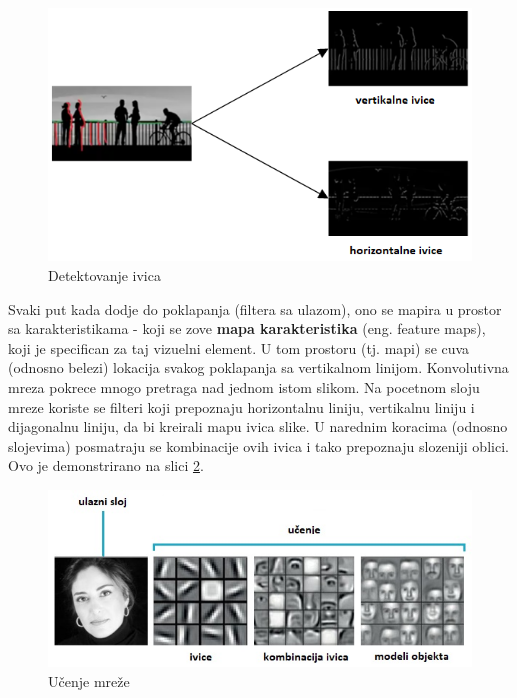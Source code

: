 \documentclass[a4paper]{article}
\begin{document}
\begin{figure}[h!]
\begin{center}
\includegraphics[scale=1]{edges.png}
\end{center}
\caption{Detektovanje ivica}
\label{fig:edges}
\end{figure}

Svaki put kada dodje do poklapanja (filtera sa ulazom), ono se mapira u prostor sa karakteristikama - koji se zove \textbf{mapa karakteristika} (eng. feature maps), koji je specifican za taj vizuelni element. U tom prostoru (tj. mapi) se cuva (odnosno belezi) lokacija svakog poklapanja sa vertikalnom linijom. Konvolutivna mreza pokrece mnogo pretraga nad jednom istom slikom. Na pocetnom sloju mreze koriste se filteri koji prepoznaju horizontalnu liniju, vertikalnu liniju i dijagonalnu liniju, da bi kreirali mapu ivica slike. U narednim koracima (odnosno slojevima) posmatraju se kombinacije ovih ivica i tako prepoznaju slozeniji oblici. Ovo je demonstrirano na slici \ref{fig:learning}.

\begin{figure}[h!]
\begin{center}
\includegraphics[scale=0.9]{learning.jpg}
\end{center}
\caption{Učenje mreže}
\label{fig:learning}
\end{figure}
\end{document}

